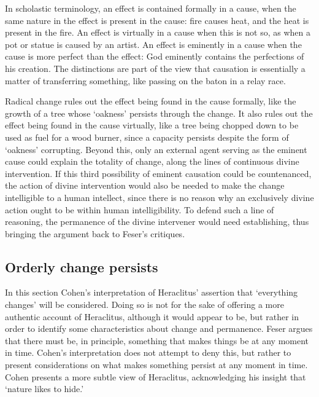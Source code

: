 \begin{quoting}
In scholastic terminology, an effect is contained formally in a cause, when the same nature in the effect is present in the cause: fire causes heat, and the heat is present in the fire. An effect is virtually in a cause when this is not so, as when a pot or statue is caused by an artist. An effect is eminently in a cause when the cause is more perfect than the effect: God eminently contains the perfections of his creation. The distinctions are part of the view that causation is essentially a matter of transferring something, like passing on the baton in a relay race. \parencite[][]{blackburn2005oxford}
\end{quoting}

Radical change rules out the effect being found in the cause formally, like the growth of a tree whose `oakness' persists through the change. It also rules out the effect being found in the cause virtually, like a tree being chopped down to be used as fuel for a wood burner, since a capacity persists despite the form of `oakness' corrupting. Beyond this, only an external agent serving as the eminent cause could explain the totality of change, along the lines of continuous divine intervention. If this third possibility of eminent causation could be countenanced, the action of divine intervention would also be needed to make the change intelligible to a human intellect, since there is no reason why an exclusively divine action ought to be within human intelligibility. To defend such a line of reasoning, the permanence of the divine intervener would need establishing, thus bringing the argument back to Feser's critiques.


\subsection{Orderly change persists}

In this section Cohen's interpretation of Heraclitus' assertion that `everything changes' will be considered.
Doing so is not for the sake of offering a more authentic account of Heraclitus, although it would appear to be, but rather in order to identify some characteristics about change and permanence. Feser argues that there must be, in principle, something that makes things be at any moment in time. Cohen's interpretation does not attempt to deny this, but rather to present considerations on what makes something persist at any moment in time. Cohen presents a more subtle view of Heraclitus, acknowledging his insight that `nature likes to hide.' \autocite[][34]{fitt1983ancilla}

